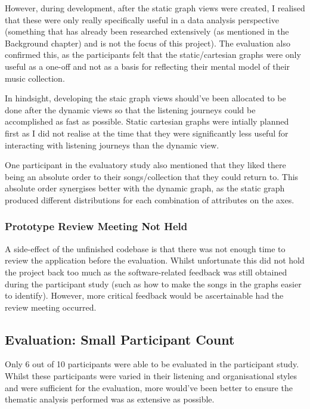 However, during development, after the static graph views were created, I realised that these were only really specifically useful in a data analysis perspective (something that has already been researched extensively (as mentioned in the Background chapter) and is not the focus of this project). The evaluation also confirmed this, as the participants felt that the static/cartesian graphs were only useful as a one-off and not as a basis for reflecting their mental model of their music collection.

In hindsight, developing the staic graph views should've been allocated to be done after the dynamic views so that the listening journeys could be accomplished as fast as possible. Static cartesian graphs were intially planned first as I did not realise at the time that they were significantly less useful for interacting with listening journeys than the dynamic view.

One participant in the evaluatory study also mentioned that they liked there being an absolute order to their songs/collection that they could return to. This absolute order synergises better with the dynamic graph, as the static graph produced different distributions for each combination of attributes on the axes.

\subsubsection{Prototype Review Meeting Not Held}
A side-effect of the unfinished codebase is that there was not enough time to review the application before the evaluation. Whilst unfortunate this did not hold the project back too much as the software-related feedback was still obtained during the participant study (such as how to make the songs in the graphs easier to identify). However, more critical feedback would be ascertainable had the review meeting occurred.

\subsection{Evaluation: Small Participant Count}
Only 6 out of 10 participants were able to be evaluated in the participant study. Whilst these participants were varied in their listening and organisational styles and were sufficient for the evaluation, more would've been better to ensure the thematic analysis performed was as extensive as possible.

